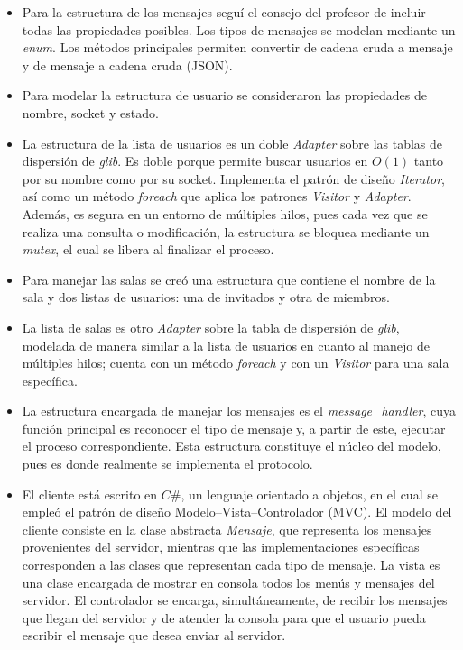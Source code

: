 \documentclass{article}
\begin{document}
\begin{itemize}
        \item Para la estructura de los mensajes seguí el consejo del profesor de incluir todas las propiedades posibles. Los tipos de mensajes se modelan mediante un \textit{enum}. Los métodos principales permiten convertir de cadena cruda a mensaje y de mensaje a cadena cruda (JSON).
        \item Para modelar la estructura de usuario se consideraron las propiedades de nombre, socket y estado.
        \item La estructura de la lista de usuarios es un doble \textit{Adapter} sobre las tablas de dispersión de \textit{glib}. Es doble porque permite buscar usuarios en $O(1)$ tanto por su nombre como por su socket. Implementa el patrón de diseño \textit{Iterator}, así como un método \textit{foreach} que aplica los patrones \textit{Visitor} y \textit{Adapter}. Además, es segura en un entorno de múltiples hilos, pues cada vez que se realiza una consulta o modificación, la estructura se bloquea mediante un \textit{mutex}, el cual se libera al finalizar el proceso.
        \item Para manejar las salas se creó una estructura que contiene el nombre de la sala y dos listas de usuarios: una de invitados y otra de miembros.
        \item La lista de salas es otro \textit{Adapter} sobre la tabla de dispersión de \textit{glib}, modelada de manera similar a la lista de usuarios en cuanto al manejo de múltiples hilos; cuenta con un método \textit{foreach} y con un \textit{Visitor} para una sala específica.
        \item La estructura encargada de manejar los mensajes es el \textit{message\_handler}, cuya función principal es reconocer el tipo de mensaje y, a partir de este, ejecutar el proceso correspondiente. Esta estructura constituye el núcleo del modelo, pues es donde realmente se implementa el protocolo.
        \item El cliente está escrito en $C\#$, un lenguaje orientado a objetos, en el cual se empleó el patrón de diseño Modelo--Vista--Controlador (MVC). El modelo del cliente consiste en la clase abstracta \textit{Mensaje}, que representa los mensajes provenientes del servidor, mientras que las implementaciones específicas corresponden a las clases que representan cada tipo de mensaje. La vista es una clase encargada de mostrar en consola todos los menús y mensajes del servidor. El controlador se encarga, simultáneamente, de recibir los mensajes que llegan del servidor y de atender la consola para que el usuario pueda escribir el mensaje que desea enviar al servidor.
    \end{itemize}
\end{document}
